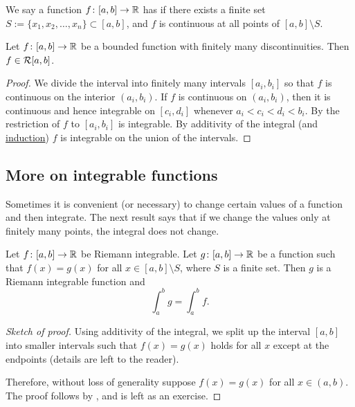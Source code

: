 We say a function $f \colon [a,b] \to {\mathbb{R}}$ has \emph{} if there exists a finite set $S := \{ x_1, x_2, \ldots, x_n \}
\subset [a,b]$, and $f$ is continuous
at all points of $[a,b] \setminus S$.

\begin{thm}
Let $f \colon [a,b] \to {\mathbb{R}}$ be a bounded function with finitely
many discontinuities.  Then $f \in {\mathcal{R}}[a,b]$.
\end{thm}

\begin{proof}
We divide the interval into finitely many intervals $[a_i,b_i]$
so that $f$ is continuous
on the interior $(a_i,b_i)$.  If $f$ is continuous on $(a_i,b_i)$,
then it is continuous and hence integrable on $[c_i,d_i]$ whenever $a_i < c_i < d_i < b_i$.  By
the restriction
of $f$ to $[a_i,b_i]$ is integrable.  By additivity of the integral (and
\hyperref[induction:thm]{induction}) $f$ is integrable on the union of the intervals.
\end{proof}

\subsection{More on integrable functions}

Sometimes it is convenient (or necessary)
to change certain values of a function and
then integrate.  The next result says
that if we change the values only at finitely
many points, the integral does not change.

\begin{prop}
Let $f \colon [a,b] \to {\mathbb{R}}$ be Riemann integrable.  Let $g \colon [a,b] \to
{\mathbb{R}}$ be a function such that $f(x) = g(x)$ for all $x \in [a,b] \setminus S$,
where $S$ is a finite set.  Then $g$ is a Riemann integrable function
and
\begin{equation*}
\int_a^b g = \int_a^b f.
\end{equation*}
\end{prop}

\begin{proof}[Sketch of proof]
Using additivity of the integral, we split up the interval $[a,b]$ into
smaller intervals such that $f(x) = g(x)$ holds for all $x$ except at the
endpoints (details are left to the reader).

Therefore, without loss of generality suppose $f(x) = g(x)$ for
all $x \in (a,b)$.  The proof follows by ,
and is left as an exercise.
\end{proof}

